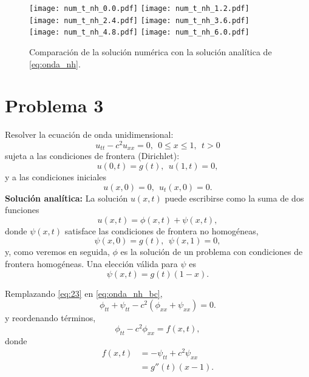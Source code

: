 \documentclass[11pt]{article}
\begin{document}
\begin{figure}[h]
  \centering
    \texttt{[image: num\_t\_nh\_0.0.pdf]} 
  \texttt{[image: num\_t\_nh\_1.2.pdf]} \\
  \texttt{[image: num\_t\_nh\_2.4.pdf]} 
  \texttt{[image: num\_t\_nh\_3.6.pdf]} \\
  \texttt{[image: num\_t\_nh\_4.8.pdf]}
  \texttt{[image: num\_t\_nh\_6.0.pdf]}
  \caption{Comparaci\'on de la soluci\'on num\'erica con la soluci\'on anal\'itica de \eqref{eq:onda_nh}.}
  \label{fig:num_nh_dir}
\end{figure}




\clearpage
\section*{Problema 3}
Resolver la ecuaci\'on de onda unidimensional:
\begin{equation}
  \label{eq:onda_nh_bc}
  u_{tt} - c^2 u_{xx} = 0,~~0 \le x \le 1,~~t>0
\end{equation}
sujeta a las condiciones de frontera (Dirichlet):
\begin{equation}
  \label{eq:dirich}
  u(0,t) = g(t),~~u(1,t) = 0,
\end{equation}
y a las condiciones iniciales
\begin{equation}
  \label{eq:6}
  u(x,0) = 0,~~u_t(x,0)=0.
\end{equation}
{\bf Soluci\'on anal\'itica:} La soluci\'on $u(x,t)$ puede escribirse como la suma de dos funciones
\begin{equation}
  \label{eq:23}
  u(x,t) = \phi(x,t) + \psi(x,t),
\end{equation}
donde $\psi(x,t)$ satisface las condiciones de frontera no homog\'eneas,
\begin{equation}
  \label{eq:28}
  \psi(x,0) = g(t),~~\psi(x,1) = 0,
\end{equation}
y, como veremos en seguida, $\phi$ es la soluci\'on de un problema con condiciones de frontera homog\'eneas. Una elecci\'on v\'alida para $\psi$ es
\begin{equation}
  \label{eq:31}
  \psi(x,t) = g(t)(1-x).
\end{equation}

Remplazando \eqref{eq:23} en \eqref{eq:onda_nh_bc},
\begin{equation}
  \label{eq:24}
  \phi_{tt} + \psi_{tt} - c^2(\phi_{xx} + \psi_{xx}) = 0.
\end{equation}
y reordenando t\'erminos,
\begin{equation}
  \label{eq:25}
  \phi_{tt} - c^2\phi_{xx} = f(x,t),
\end{equation}
donde
\begin{align}
  \label{eq:26}
  f(x,t) &= -\psi_{tt} + c^2\psi_{xx} \\
         &= g''(t)(x-1).
\end{align}
\end{document}
